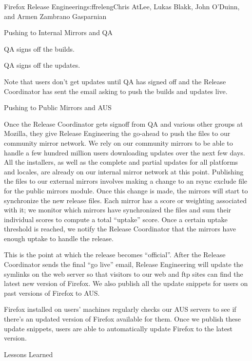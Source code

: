 \begin{aosachapter}{Firefox Release Engineering}{s:ffreleng}{Chris AtLee, Lukas Blakk, John O'Duinn, and Armen Zambrano Gasparnian}
\begin{aosasect1}{Pushing to Internal Mirrors and QA}
\begin{aosaitemize}
\item QA signs off the builds.

\item QA signs off the updates.

\end{aosaitemize}
  
Note that users don't get updates until QA has signed off and the
Release Coordinator has sent the email asking to push the builds and
updates live.
 
\end{aosasect1}

\begin{aosasect1}{Pushing to Public Mirrors and AUS}

Once the Release Coordinator gets signoff from QA and various
other groups at Mozilla, they give
Release Engineering the go-ahead to push the files to our
community mirror network. We rely on our community mirrors to be
able to handle a few hundred million users downloading updates
over the next few days. All the installers, as well as the complete 
and partial updates for all platforms and locales, are already on our
internal mirror network at this point. Publishing the files to
our external mirrors involves making a change to an rsync exclude file
for the public mirrors module.  Once this change is made, the
mirrors will start to synchronize the new release files. Each     
mirror has a score or weighting associated with it; we monitor which mirrors have
synchronized the files and sum their individual scores to compute a
total ``uptake'' score. Once a certain uptake threshold is reached, we notify
the Release Coordinator that the mirrors have enough uptake to handle
the release.

This is the point at which the release becomes ``official''. After the
Release Coordinator sends the final ``go live'' email, Release
Engineering will update the symlinks on the web server so that
visitors to our web and ftp sites can find the latest new version of
Firefox. We also publish all the update snippets for users on past versions of
Firefox to AUS. 

Firefox installed on users' machines regularly checks our AUS
servers to see if there's an updated version of Firefox available for
them. Once we publish these update snippets, users are able to
automatically update Firefox to the latest version.
  
\end{aosasect1}

\begin{aosasect1}{Lessons Learned}


\end{aosasect1}
\end{aosachapter}
